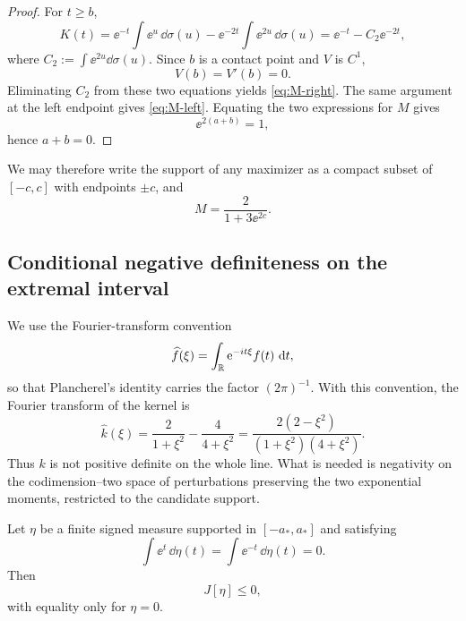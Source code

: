 \begin{proof}
For $t\ge b$,
\[
 K(t)=\ee^{-t}\int\ee^u\,\dd\sigma(u)
 -\ee^{-2t}\int\ee^{2u}\,\dd\sigma(u)
 =\ee^{-t}-C_2\ee^{-2t},
\]
where $C_2:=\int\ee^{2u}\dd\sigma(u)$.  Since $b$ is a contact point and $V$ is $C^1$,
\[
 V(b)=V'(b)=0.
\]
Eliminating $C_2$ from these two equations yields \eqref{eq:M-right}.  The same argument at the left endpoint gives \eqref{eq:M-left}.  Equating the two expressions for $M$ gives
\[
 \ee^{2(a+b)}=1,
\]
hence $a+b=0$.
\end{proof}

We may therefore write the support of any maximizer as a compact subset of $[-c,c]$ with endpoints $\pm c$, and
\begin{equation}\label{eq:M-c}
 M=\frac{2}{1+3\ee^{2c}}.
\end{equation}

\subsection{Conditional negative definiteness on the extremal interval}

We use the Fourier-transform convention
\[
 \widehat f(\xi)=\int_{\mathbb{R}}\mathrm{e}^{-it\xi}f(t)\,\,\mathrm{d} t,
\]
so that Plancherel's identity carries the factor $(2\pi)^{-1}$.  With this convention, the Fourier transform of the kernel is
\begin{equation}\label{eq:khat}
 \widehat{k}(\xi)
 =\frac{2}{1+\xi^2}-\frac{4}{4+\xi^2}
 =\frac{2(2-\xi^2)}{(1+\xi^2)(4+\xi^2)}.
\end{equation}
Thus $k$ is not positive definite on the whole line.  What is needed is negativity on the codimension--two space of perturbations preserving the two exponential moments, restricted to the candidate support.

\begin{lemma}\label{lem:conditional-negativity}
Let $\eta$ be a finite signed measure supported in $[-a_*,a_*]$ and satisfying
\begin{equation}\label{eq:eta-moments}
 \int\ee^t\,\dd\eta(t)=
 \int\ee^{-t}\,\dd\eta(t)=0.
\end{equation}
Then
\begin{equation}\label{eq:Jeta-negative}
 J[\eta]\le0,
\end{equation}
with equality only for $\eta=0$.
\end{lemma}

